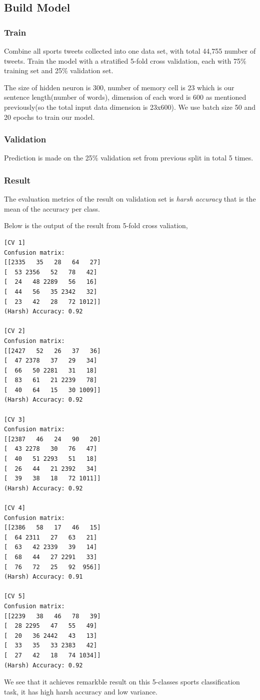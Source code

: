 \documentclass[journal, a4paper]{IEEEtran}
\begin{document}
\subsection{Build Model}
\subsubsection{Train}
Combine all sports tweets collected into one data set, with total 44,755 number of tweets. Train the model with a stratified 5-fold cross validation, each with 75\% training set and 25\% validation set. 

The size of hidden neuron is 300, number of memory cell is 23 which is our sentence length(number of words), dimension of each word is 600 as mentioned previously(so the total input data dimension is 23x600). We use batch size 50 and 20 epochs to train our model. 
\subsubsection{Validation}
Prediction is made on the 25\% validation set from previous split in total 5 times.
\subsubsection{Result}
The evaluation metrics of the result on validation set is \textit{harsh accuracy} that is the mean of the accuracy per class. 

Below is the output of the result from 5-fold cross valiation,
\begin{verbatim}
[CV 1]
Confusion matrix:
[[2335   35   28   64   27]
[  53 2356   52   78   42]
[  24   48 2289   56   16]
[  44   56   35 2342   32]
[  23   42   28   72 1012]]
(Harsh) Accuracy: 0.92

[CV 2]
Confusion matrix:
[[2427   52   26   37   36]
[  47 2378   37   29   34]
[  66   50 2281   31   18]
[  83   61   21 2239   78]
[  40   64   15   30 1009]]
(Harsh) Accuracy: 0.92

[CV 3]
Confusion matrix:
[[2387   46   24   90   20]
[  43 2278   30   76   47]
[  40   51 2293   51   18]
[  26   44   21 2392   34]
[  39   38   18   72 1011]]
(Harsh) Accuracy: 0.92

[CV 4]
Confusion matrix:
[[2386   58   17   46   15]
[  64 2311   27   63   21]
[  63   42 2339   39   14]
[  68   44   27 2291   33]
[  76   72   25   92  956]]
(Harsh) Accuracy: 0.91

[CV 5]
Confusion matrix:
[[2239   38   46   78   39]
[  28 2295   47   55   49]
[  20   36 2442   43   13]
[  33   35   33 2383   42]
[  27   42   18   74 1034]]
(Harsh) Accuracy: 0.92
\end{verbatim}
We see that it achieves remarkble result on this 5-classes sports classification task, it has high harsh accuracy and low variance. 
\end{document}
